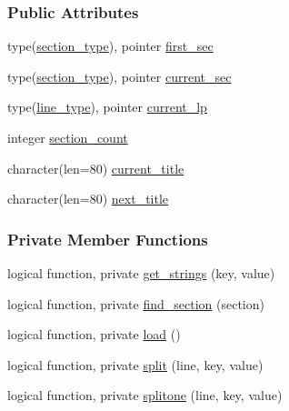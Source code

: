 \subsubsection*{Public Attributes}
\begin{DoxyCompactItemize}
\item 
type(\hyperlink{structprmfile_1_1section__type}{section\-\_\-type}), pointer \hyperlink{classprmfile_ad554732d9493ba99cc02ed18dd01d2f7}{first\-\_\-sec}
\item 
type(\hyperlink{structprmfile_1_1section__type}{section\-\_\-type}), pointer \hyperlink{classprmfile_a579a695a37c5bbf10236c4402c9d6eab}{current\-\_\-sec}
\item 
type(\hyperlink{structprmfile_1_1line__type}{line\-\_\-type}), pointer \hyperlink{classprmfile_a50199e70faf66f6bb161f0c8584321e3}{current\-\_\-lp}
\item 
integer \hyperlink{classprmfile_a013c6ccd83e5058a2ccf707b491b4fde}{section\-\_\-count}
\item 
character(len=80) \hyperlink{classprmfile_a7a562b2223aab72351460a62e10452d5}{current\-\_\-title}
\item 
character(len=80) \hyperlink{classprmfile_a2b445359c65093bfa9db2cd3a999a1d5}{next\-\_\-title}
\end{DoxyCompactItemize}
\subsubsection*{Private Member Functions}
\begin{DoxyCompactItemize}
\item 
logical function, private \hyperlink{classprmfile_a6b7898805f9d12f29429016f458315dd}{get\-\_\-strings} (key, value)
\item 
logical function, private \hyperlink{classprmfile_a8c291db6f5a0ead5412d28f67b838616}{find\-\_\-section} (section)
\item 
logical function, private \hyperlink{classprmfile_acce15d60959fb0d53e604d35518b4f1f}{load} ()
\item 
logical function, private \hyperlink{classprmfile_a10afa2d1367eb5c8007b284387e40d64}{split} (line, key, value)
\item 
logical function, private \hyperlink{classprmfile_a3e5d310c7d957b0bde0cf97b622d2cea}{splitone} (line, key, value)
\end{DoxyCompactItemize}
